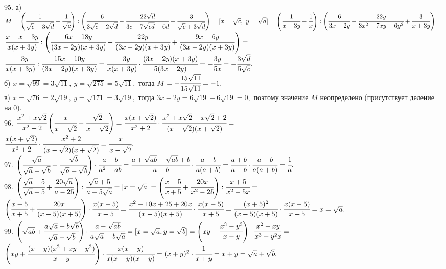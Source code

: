 95. а) $M=\left(\cfrac{1}{\sqrt{c}+3\sqrt{d}}-\cfrac{1}{\sqrt{c}}\right):\left(\cfrac{6}{3\sqrt{c}-2\sqrt{d}}-\cfrac{22\sqrt{d}}{3c+7\sqrt{cd}-6d}+\cfrac{3}{\sqrt{c}+3\sqrt{d}}\right)=
[x=\sqrt{c},\ y=\sqrt{d}]=
\left(\cfrac{1}{x+3y}-\cfrac{1}{x}\right):\left(\cfrac{6}{3x-2y}-\cfrac{22y}{3x^2+7xy-6y^2}+\cfrac{3}{x+3y}\right)=$\\$
\cfrac{x-x-3y}{x(x+3y)}:\left(\cfrac{6x+18y}{(3x-2y)(x+3y)}-\cfrac{22y}{(3x-2y)(x+3y)}+\cfrac{9x-6y}{(3x-2y)(x+3y)}\right)=$\\$
\cfrac{-3y}{x(x+3y)}:\cfrac{15x-10y}{(3x-2y)(x+3y)}=\cfrac{-3y}{x(x+3y)}\cdot\cfrac{(3x-2y)(x+3y)}{5(3x-2y)}=-\cfrac{3y}{5x}=-\cfrac{3\sqrt{d}}{5\sqrt{c}}.$\\
б) $x=\sqrt{99}=3\sqrt{11},\ y=\sqrt{275}=5\sqrt{11},$ тогда $M=-\cfrac{15\sqrt{11}}{15\sqrt{11}}=-1.$\\
в) $x=\sqrt{76}=2\sqrt{19},\ y=\sqrt{171}=3\sqrt{19},$ тогда $3x-2y=6\sqrt{19}-6\sqrt{19}=0,$ поэтому значение $M$ неопределено (присутствует деление на 0).\\
96. $\cfrac{x^2+x\sqrt{2}}{x^2+2}\left(\cfrac{x}{x-\sqrt{2}}-\cfrac{\sqrt{2}}{x+\sqrt{2}}\right)=
\cfrac{x(x+\sqrt{2})}{x^2+2}\cdot\cfrac{x^2+x\sqrt{2}-x\sqrt{2}+2}{(x-\sqrt{2})(x+\sqrt{2})}=$\\$
\cfrac{x(x+\sqrt{2})}{x^2+2}\cdot\cfrac{x^2+2}{(x-\sqrt{2})(x+\sqrt{2})}=\cfrac{x}{x-\sqrt{2}}.$\\
97. $\left(\cfrac{\sqrt{a}}{\sqrt{a}-\sqrt{b}}-\cfrac{\sqrt{b}}{\sqrt{a}+\sqrt{b}}\right)\cdot\cfrac{a-b}{a^2+ab}=
\cfrac{a+\sqrt{ab}-\sqrt{ab}+b}{a-b}\cdot\cfrac{a-b}{a(a+b)}=
\cfrac{a+b}{a-b}\cdot\cfrac{a-b}{a(a+b)}=\cfrac{1}{a}.$\\
98. $\left(\cfrac{\sqrt{a}-5}{\sqrt{a}+5}+\cfrac{20\sqrt{a}}{a-25}\right):\cfrac{\sqrt{a}+5}{a-5\sqrt{a}}=[x=\sqrt{a}]=
\left(\cfrac{x-5}{x+5}+\cfrac{20x}{x^2-25}\right):\cfrac{x+5}{x^2-5x}=$\\$
\left(\cfrac{x-5}{x+5}+\cfrac{20x}{(x-5)(x+5)}\right)\cdot\cfrac{x(x-5)}{x+5}=\cfrac{x^2-10x+25+20x}{(x-5)(x+5)}\cdot\cfrac{x(x-5)}{x+5}=
\cfrac{(x+5)^2}{(x-5)(x+5)}\cdot\cfrac{x(x-5)}{x+5}=x=\sqrt{a}.$\\
99. $\left(\sqrt{ab}+\cfrac{a\sqrt{a}-b\sqrt{b}}{\sqrt{a}-\sqrt{b}}\right)\cdot\cfrac{a-\sqrt{ab}}{a\sqrt{a}-b\sqrt{a}}=
[x=\sqrt{a}, y=\sqrt{b}]=\left(xy+\cfrac{x^3-y^3}{x-y}\right)\cdot\cfrac{x^2-xy}{x^3-y^2x}=$\\$
\left(xy+\cfrac{(x-y)(x^2+xy+y^2)}{x-y}\right)\cdot\cfrac{x(x-y)}{x(x-y)(x+y)}=
(x+y)^2\cdot\cfrac{1}{x+y}=x+y=\sqrt{a}+\sqrt{b}.$\\
